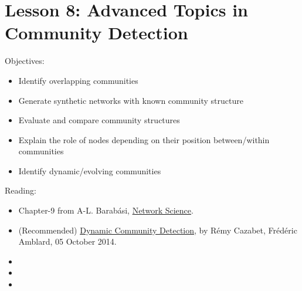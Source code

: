 \documentclass[11pt]{scrartcl} %
\begin{document}
\paragraph{}
\paragraph{}
\paragraph{}
\paragraph{}
\textbf{}




\section{Lesson 8: Advanced Topics in Community Detection}

Objectives:
\begin{itemize}
	\item Identify overlapping communities
	\item Generate synthetic networks with known community structure
	\item Evaluate and compare community structures
	\item Explain the role of nodes depending on their position between/within communities
	\item Identify dynamic/evolving communities
\end{itemize}

Reading:
\begin{itemize}
	\item Chapter-9 from A-L. Barabási, \href{http://networksciencebook.com/}{Network Science}.
	\item (Recommended) \href{http://\%20https//doi.org/10.1007/978-1-4614-6170-8_383}{Dynamic Community Detection}, by Rémy Cazabet, Frédéric Amblard, 05 October 2014.
	\item 
	\item 
	\item 
\end{itemize}
\end{document}
